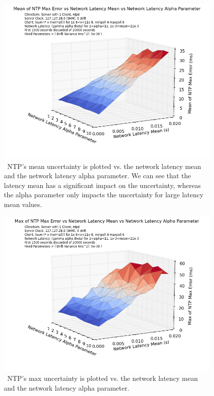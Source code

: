 \begin{figure}[h]
  \caption{~NTP's mean uncertainty is plotted vs. the network latency mean and the network latency alpha parameter. We can see that the latency mean has a significant impact on the uncertainty, whereas the alpha parameter only impacts the uncertainty for large latency mean values.}
  \label{fig:mean-uncertainty_latency-mean_latency-alpha}
  \includegraphics[width=0.8\linewidth]{mean_max_error-mean_latency-latency_alpha.png}
\end{figure}



\begin{figure}[h]
  \caption{~NTP's max uncertainty is plotted vs. the network latency mean and the network latency alpha parameter.}
  \label{fig:max-uncertainty_latency-mean_latency-alpha}
  \includegraphics[width=0.8\linewidth]{max_error-latency_mean-latency_alpha.png}
\end{figure}

